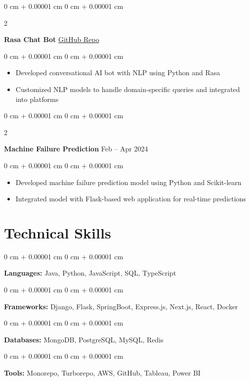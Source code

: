 \documentclass[11pt, letterpaper]{article}
\newenvironment{highlights}{
    \begin{itemize}[
        topsep=0.05 cm,
        parsep=0.05 cm,
        partopsep=0pt,
        itemsep=0pt,
        leftmargin=0 cm + 10pt
    ]
}{
    \end{itemize}
} %
\newenvironment{onecolentry}{
    \begin{adjustwidth}{
        0 cm + 0.00001 cm
    }{
        0 cm + 0.00001 cm
    }
}{
    \end{adjustwidth}
} %
\newenvironment{twocolentry}[2][]{
    \onecolentry
    \def\secondColumn{#2}
    \setcolumnwidth{\fill, 3.5 cm}
    \begin{paracol}{2}
}{
    \switchcolumn \centering \secondColumn
    \end{paracol}
    \endonecolentry
} %
\begin{document}
    \vspace{0.1 cm}
    \begin{twocolentry}{
        \href{https://github.com/OjhaGopal/Rasa-Chat-Bot}{GitHub Repo}
    }
        \textbf{Rasa Chat Bot}\end{twocolentry}
    \vspace{0.02 cm}
    \begin{onecolentry}
        \begin{highlights}
            \item Developed conversational AI bot with NLP using Python and Rasa
            \item Customized NLP models to handle domain-specific queries and integrated into platforms
        \end{highlights}
    \end{onecolentry}

    \vspace{0.1 cm}
    \begin{twocolentry}{
        Feb – Apr 2024
    }
        \textbf{Machine Failure Prediction}\end{twocolentry}
    \vspace{0.02 cm}
    \begin{onecolentry}
        \begin{highlights}
            \item Developed machine failure prediction model using Python and Scikit-learn
            \item Integrated model with Flask-based web application for real-time predictions
        \end{highlights}
    \end{onecolentry}

    \vspace{0.15 cm}

    \section{Technical Skills}

    \begin{onecolentry}
        \textbf{Languages:} Java, Python, JavaScript, SQL, TypeScript
    \end{onecolentry}
    \vspace{0.05 cm}
    \begin{onecolentry}
        \textbf{Frameworks:} Django, Flask, SpringBoot, Express.js, Next.js, React, Docker
    \end{onecolentry}
    \vspace{0.05 cm}
    \begin{onecolentry}
        \textbf{Databases:} MongoDB, PostgreSQL, MySQL, Redis
    \end{onecolentry}
    \vspace{0.05 cm}
    \begin{onecolentry}
        \textbf{Tools:} Monorepo, Turborepo, AWS, GitHub, Tableau, Power BI
    \end{onecolentry}
\end{document}

